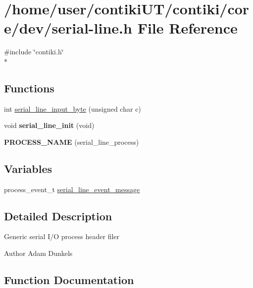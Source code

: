 \hypertarget{serial-line_8h}{}\section{/home/user/contiki\+U\+T/contiki/core/dev/serial-\/line.h File Reference}
\label{serial-line_8h}
{\ttfamily \#include \char`\"{}contiki.\+h\char`\"{}}\\*
\subsection*{Functions}
\begin{DoxyCompactItemize}
\item 
int \hyperlink{serial-line_8h_ad81ea2a42dbb17b32bbf1cbd00e6d429}{serial\+\_\+line\+\_\+input\+\_\+byte} (unsigned char c)
\item 
\hypertarget{serial-line_8h_a65b3553ca8eb4d6eefffaa3c5d138e0c}{}void {\bfseries serial\+\_\+line\+\_\+init} (void)\label{serial-line_8h_a65b3553ca8eb4d6eefffaa3c5d138e0c}

\item 
\hypertarget{serial-line_8h_ab0e23583a470b738bb4b5e81b68d4f15}{}{\bfseries P\+R\+O\+C\+E\+S\+S\+\_\+\+N\+A\+M\+E} (serial\+\_\+line\+\_\+process)\label{serial-line_8h_ab0e23583a470b738bb4b5e81b68d4f15}

\end{DoxyCompactItemize}
\subsection*{Variables}
\begin{DoxyCompactItemize}
\item 
process\+\_\+event\+\_\+t \hyperlink{serial-line_8h_aff9e9fcec2b8108edd16ae3c0545c0db}{serial\+\_\+line\+\_\+event\+\_\+message}
\end{DoxyCompactItemize}


\subsection{Detailed Description}
Generic serial I/\+O process header filer \begin{DoxyAuthor}{Author}
Adam Dunkels 
\end{DoxyAuthor}


\subsection{Function Documentation}
\hypertarget{serial-line_8h_ad81ea2a42dbb17b32bbf1cbd00e6d429}{}
